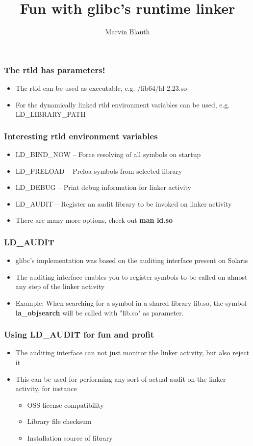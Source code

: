 \documentclass{beamer}
\title{Fun with glibc's runtime linker}
\author{Marvin Blauth}
\begin{document}
\frame{\titlepage}

\begin{frame}
  \frametitle{The rtld has parameters!}
  \begin{itemize}
    \item The rtld can be used as executable, e.g. /lib64/ld-2.23.so
    \item For the dynamically linked rtld environment variables can be used, e.g. LD\_LIBRARY\_PATH
  \end{itemize}
\end{frame}

\begin{frame}
  \frametitle{Interesting rtld environment variables}
  \begin{itemize}
    \item LD\_BIND\_NOW -- Force resolving of all symbols on startup
    \item LD\_PRELOAD -- Preloa symbols from selected library
    \item LD\_DEBUG -- Print debug information for linker activity
    \item LD\_AUDIT -- Register an audit library to be invoked on linker activity
    \item There are many more options, check out \textbf{man ld.so}
  \end{itemize}
\end{frame}

\begin{frame}
  \frametitle{LD\_AUDIT}
  \begin{itemize}
    \item glibc's implementation was based on the auditing interface present on Solaris
    \item The auditing interface enables you to register symbols to be called on almost any step of the linker activity
    \item Example: When searching for a symbol in a shared library lib.so, the symbol \textbf{la\_objsearch} will be
          called with "lib.so" as parameter.
  \end{itemize}
\end{frame}

\begin{frame}
  \frametitle{Using LD\_AUDIT for fun and profit}
  \begin{itemize}
    \item The auditing interface can not just monitor the linker activity, but also reject it
    \item This can be used for performing any sort of actual audit on the linker activity, for instance
    \begin{itemize}
      \item OSS license compatibility
      \item Library file checksum
      \item Installation source of library
    \end{itemize}
  \end{itemize}
\end{frame}
\end{document}
